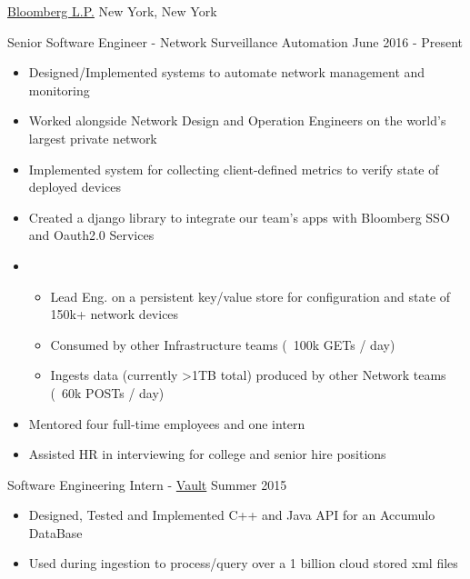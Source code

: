 \documentclass[11pt]{article}
\begin{document}
\headedsection  %
{\href{http://www.bloomberg.com/company}{Bloomberg L.P.}}
{New York, New York}
{
    \headedsubsection
    {Senior Software Engineer - Network Surveillance Automation}
    {June 2016 - Present}
    {
        \begin{itemize}
            \item Designed/Implemented systems to automate network management and monitoring
            \item Worked alongside Network Design and Operation Engineers on the world's largest private network
            \item Implemented system for collecting client-defined metrics to verify state of deployed devices
            \item Created a django library to integrate our team's apps with Bloomberg SSO and Oauth2.0 Services
            \item{}
            { \begin{itemize}
                \item Lead Eng. on a persistent key/value store for configuration and state of 150k+ network devices
                \item Consumed by other Infrastructure teams (~100k GETs / day)
                \item Ingests data (currently >1TB total) produced by other Network teams (~60k POSTs / day)
                \end{itemize} }
            \item Mentored four full-time employees and one intern
            \item Assisted HR in interviewing for college and senior hire positions
        \end{itemize}

    }
}
\headedsection  %
{}
{}
{
    \headedsubsection
    {Software Engineering Intern - \href{https://www.bloomberg.com/professional/product/vault/}{Vault}}
    {Summer 2015}
    {
        \begin{itemize}
            \item Designed, Tested and Implemented C++ and Java API for an Accumulo DataBase
            \item Used during ingestion to process/query over a 1 billion cloud stored xml files
        \end{itemize}
    }
}
\end{document}
